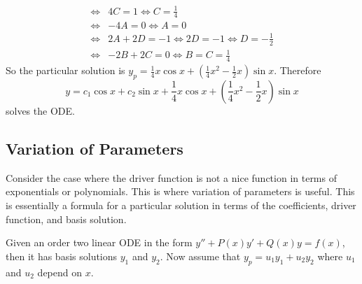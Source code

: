 \documentclass[notes]{subfiles}
\begin{document}
\begin{solution}
\begin{align*}
        \iff& 4C = 1 \iff C = \frac{1}{4} \\
        \iff& -4A = 0 \iff A = 0 \\
        \iff& 2A + 2D = -1 \iff 2D = -1 \iff D = -\frac{1}{2} \\
        \iff& -2B + 2C = 0 \iff B = C = \frac{1}{4}
    \end{align*}
    So the particular solution is $y_p = \frac{1}{4}x\cos x + \left( \frac{1}{4}x^2 - \frac{1}{2}x \right)\sin x$. Therefore
    \[
        y = c_1 \cos x + c_2 \sin x + \frac{1}{4}x\cos x + \left( \frac{1}{4}x^2 - \frac{1}{2}x \right)\sin x
    \]
    solves the ODE.
\end{solution}

\subsection{Variation of Parameters}
Consider the case where the driver function is not a nice function in terms of exponentials or polynomials. This is where variation of parameters is useful. This is essentially a formula for a particular solution in terms of the coefficients, driver function, and basis solution.

Given an order two linear ODE in the form $y'' + P(x)y' + Q(x)y = f(x)$, then it has basis solutions $y_1$ and $y_2$. Now assume that $y_p = u_1y_1 + u_2y_2$ where $u_1$ and $u_2$ depend on $x$.
\end{document}

